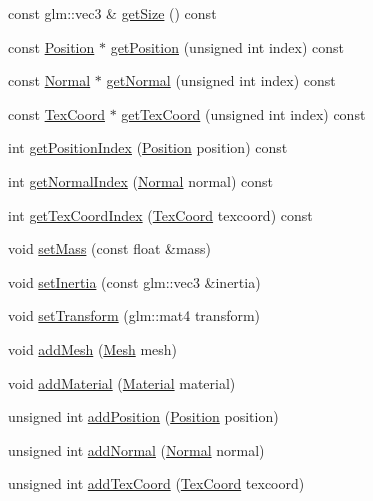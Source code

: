 \begin{DoxyCompactItemize}
\item 
const glm\+::vec3 \& \hyperlink{class_object_ac4f74b9b50fb83829b6844a2591ba50f}{get\+Size} () const
\item 
const \hyperlink{struct_position}{Position} $\ast$ \hyperlink{class_object_a247968a9aa55c670e2d462876f5e2cb6}{get\+Position} (unsigned int index) const
\item 
const \hyperlink{struct_normal}{Normal} $\ast$ \hyperlink{class_object_a096f8e6bd78d8f6d31b8897fad9b8e78}{get\+Normal} (unsigned int index) const
\item 
const \hyperlink{struct_tex_coord}{Tex\+Coord} $\ast$ \hyperlink{class_object_a703e8fc9f5aa16d5b657ed8f03f4cf02}{get\+Tex\+Coord} (unsigned int index) const
\item 
int \hyperlink{class_object_acc363689a681f08be8492107ab6ab2f4}{get\+Position\+Index} (\hyperlink{struct_position}{Position} position) const
\item 
int \hyperlink{class_object_a877e446e1e1af8bbe11db702221bc194}{get\+Normal\+Index} (\hyperlink{struct_normal}{Normal} normal) const
\item 
int \hyperlink{class_object_af99105478aba428c8c252598707323b6}{get\+Tex\+Coord\+Index} (\hyperlink{struct_tex_coord}{Tex\+Coord} texcoord) const
\item 
void \hyperlink{class_object_a426314ec1a1e0ae48cbb2b3667c63bb6}{set\+Mass} (const float \&mass)
\item 
void \hyperlink{class_object_a1a82190deb7c8c2da2f3e82562aa7b17}{set\+Inertia} (const glm\+::vec3 \&inertia)
\item 
void \hyperlink{class_object_ac1d7782db71b581a3dd60f25c00bdfd7}{set\+Transform} (glm\+::mat4 transform)
\item 
void \hyperlink{class_object_a1ef8f20019002996c0c62f2b6a38b4f6}{add\+Mesh} (\hyperlink{class_mesh}{Mesh} mesh)
\item 
void \hyperlink{class_object_aa8246a72ca14daf6627b44eaa422c4fb}{add\+Material} (\hyperlink{class_material}{Material} material)
\item 
unsigned int \hyperlink{class_object_aed6fb1a005f657408604c2c2c41e7cd1}{add\+Position} (\hyperlink{struct_position}{Position} position)
\item 
unsigned int \hyperlink{class_object_aeac027a860fad228b5cd3fa4c1a477f8}{add\+Normal} (\hyperlink{struct_normal}{Normal} normal)
\item 
unsigned int \hyperlink{class_object_af978ee81ebe44916aadc434a84fdf1bf}{add\+Tex\+Coord} (\hyperlink{struct_tex_coord}{Tex\+Coord} texcoord)
\end{DoxyCompactItemize}


